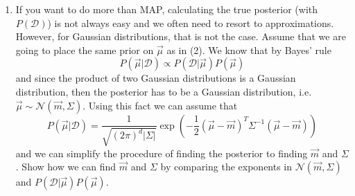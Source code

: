 \documentclass[11pt]{article}
\begin{document}
\begin{enumerate}
			\item  If you want to do more than MAP, calculating the true posterior (with ${P(\mathcal{D})}$) is not always easy  and we often need to resort to approximations. However, for Gaussian distributions, that is not the case. Assume that we are going to place the same prior on $\vec{\mu}$ as in (2). We know that by Bayes' rule $$P(\vec{\mu} | \mathcal{D}) \propto P(\mathcal{D} | \vec{\mu})P(\vec{\mu})$$ and since the product of two Gaussian distributions is a Gaussian distribution, then the posterior has to be a Gaussian distribution, i.e. $\vec{\mu}\sim \mathcal{N}(\vec{m}, \Sigma)$. Using this fact we can assume that 
\begin{equation}
	 P(\vec{\mu}| \mathcal{D}) =   \frac{1}{\sqrt{(2\pi)^{d} |\Sigma|}} \exp (-\frac{1}{2} (\vec{\mu} - \vec{m})^T \Sigma^{-1} (\vec{\mu} - \vec{m}))
\end{equation}
			 and we can simplify the procedure of finding the posterior to finding $\vec{m}$ and $\Sigma$. Show how we can find $\vec{m}$ and $\Sigma$ by comparing the exponents in $\mathcal{N}(\vec{m}, \Sigma)$ and $P(\mathcal{D} | \vec{\mu})P(\vec{\mu})$.
		\end{enumerate}
\end{document}

